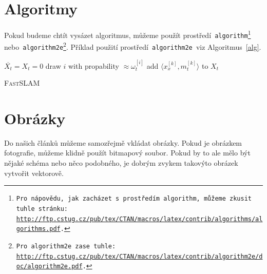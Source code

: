 \documentclass[a4paper,11pt]{article}[20-03-2022]
\begin{document}
\section{Algoritmy}
\label{sec3}
Pokud budeme chtít vysázet algoritmus, můžeme použít prostředí\texttt{ algorithm\footnote{Pro nápovědu, jak zacházet s prostředím\texttt{ algorithm,} můžeme zkusit tuhle stránku:\\\url{http://ftp.cstug.cz/pub/tex/CTAN/macros/latex/contrib/algorithms/algorithms.pdf}.} } nebo\texttt{ algorithm2e\footnote{Pro\texttt{ algorithm2e }zase tuhle: \url{http://ftp.cstug.cz/pub/tex/CTAN/macros/latex/contrib/algorithm2e/doc/algorithm2e.pdf}.}}. 
Příklad použití prostředí\texttt{ algorithm2e }viz Algoritmus~\ref{alg}.
\bigskip
\IncMargin{1.5em}
\begin{algorithm}
    \label{alg}
    \DontPrintSemicolon

    \Indm\Indmm
    \Indp\Indpp
    \BlankLine
    $\overline{X_t} = X_t = 0$\;
     {
        draw $i$ with propability $\approx \omega_t^{[i]}$\;
        add $\langle x_x^{[k]}, m_t^{[k]} \rangle$ to $X_t$\;
    }
    \caption{\textsc{FastSLAM}}
\end{algorithm}
\DecMargin{1.5em}

\section{Obrázky}
Do našich článků můžeme samozřejmě vkládat obrázky. Pokud je obrázkem fotografie, můžeme klidně použít bitmapový soubor. 
Pokud by to ale mělo být nějaké schéma nebo něco podobného, je dobrým zvykem takovýto obrázek vytvořit vektorově.
\end{document}
